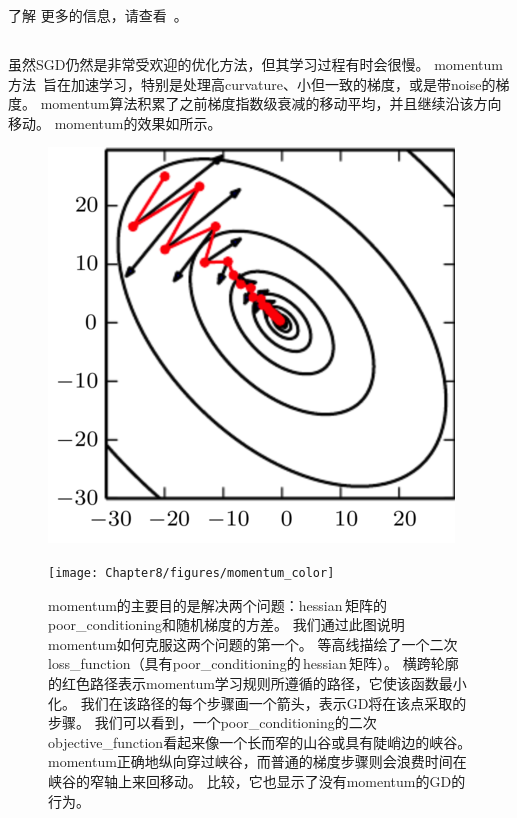 
了解\,\,更多的信息，请查看~\cite{Bottou-1998}。


\subsection{}
\label{sec:momentum}
虽然\gls{SGD}仍然是非常受欢迎的优化方法，但其学习过程有时会很慢。
\gls{momentum}方法~\citep{Polyak-1964}旨在加速学习，特别是处理高\gls{curvature}、小但一致的梯度，或是带\gls{noise}的梯度。
\gls{momentum}算法积累了之前梯度指数级衰减的移动平均，并且继续沿该方向移动。
\gls{momentum}的效果如所示。



\begin{figure}[!htb]
\ifOpenSource
\centerline{\includegraphics[scale=0.5]{images/67.png}}
\else
\centerline{\texttt{[image: Chapter8/figures/momentum\_color]}}
\fi
\caption{\gls{momentum}的主要目的是解决两个问题：\gls{hessian}\,矩阵的\gls{poor_conditioning}和随机梯度的方差。 
我们通过此图说明\gls{momentum}如何克服这两个问题的第一个。
等高线描绘了一个二次\gls{loss_function}（具有\gls{poor_conditioning}的\,\gls{hessian}\,矩阵）。
横跨轮廓的红色路径表示\gls{momentum}学习规则所遵循的路径，它使该函数最小化。
我们在该路径的每个步骤画一个箭头，表示\gls{GD}将在该点采取的步骤。
我们可以看到，一个\gls{poor_conditioning}的二次\gls{objective_function}看起来像一个长而窄的山谷或具有陡峭边的峡谷。
\gls{momentum}正确地纵向穿过峡谷，而普通的梯度步骤则会浪费时间在峡谷的窄轴上来回移动。
比较，它也显示了没有\gls{momentum}的\gls{GD}的行为。
}
\label{fig:chap8_momentum}
\end{figure}

